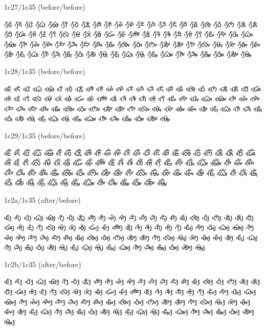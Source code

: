 \noindent
1c27/1c35 (before/before)

\noindent
ᰀᰧᰵᰶ ᰁᰧᰵᰶ ᰂᰧᰵᰶ ᰃᰧᰵᰶ ᰄᰧᰵᰶ ᰅᰧᰵᰶ ᰆᰧᰵᰶ ᰇᰧᰵᰶ ᰈᰧᰵᰶ ᰉᰧᰵᰶ ᰊᰧᰵᰶ ᰋᰧᰵᰶ ᰌᰧᰵᰶ ᰍᰧᰵᰶ ᰎᰧᰵᰶ ᰏᰧᰵᰶ ᰐᰧᰵᰶ ᰑᰧᰵᰶ ᰒᰧᰵᰶ ᰓᰧᰵᰶ ᰔᰧᰵᰶ ᰕᰧᰵᰶ ᰖᰧᰵᰶ ᰗᰧᰵᰶ ᰘᰧᰵᰶ ᰙᰧᰵᰶ ᰚᰧᰵᰶ ᰛᰧᰵᰶ ᰜᰧᰵᰶ ᰝᰧᰵᰶ ᰞᰧᰵᰶ ᰟᰧᰵᰶ ᰠᰧᰵᰶ ᰡᰧᰵᰶ ᰢᰧᰵᰶ ᰣᰧᰵᰶ ᱍᰧᰵᰶ ᱎᰧᰵᰶ ᱏᰧᰵᰶ ᰙ᰷ᰧᰵᰶ ᰛ᰷ᰧᰵᰶ ᰀᰤᰧᰵᰶ ᰁᰤᰧᰵᰶ ᰂᰤᰧᰵᰶ ᰃᰤᰧᰵᰶ ᰄᰤᰧᰵᰶ ᰅᰤᰧᰵᰶ ᰊᰤᰧᰵᰶ ᰋᰤᰧᰵᰶ ᰌᰤᰧᰵᰶ ᰎᰤᰧᰵᰶ ᰏᰤᰧᰵᰶ ᰐᰤᰧᰵᰶ ᰑᰤᰧᰵᰶ ᰒᰤᰧᰵᰶ ᰓᰤᰧᰵᰶ ᰔᰤᰧᰵᰶ ᰕᰤᰧᰵᰶ ᰖᰤᰧᰵᰶ ᰛᰤᰧᰵᰶ ᰜᰤᰧᰵᰶ ᰝᰤᰧᰵᰶ ᰞᰤᰧᰵᰶ ᰟᰤᰧᰵᰶ ᰡᰤᰧᰵᰶ ᰣᰤᰧᰵᰶ ᰀᰥᰧᰵᰶ ᰃᰥᰧᰵᰶ ᰅᰥᰧᰵᰶ ᰎᰥᰧᰵᰶ ᰑᰥᰧᰵᰶ ᰓᰥᰧᰵᰶ ᰕᰥᰧᰵᰶ ᰝᰥᰧᰵᰶ ᰀ᰷ᰥᰧᰵᰶ ᰃ᰷ᰥᰧᰵᰶ ᰝ᰷ᰥᰧᰵᰶ ᰀᰥᰤᰧᰵᰶ ᰃᰥᰤᰧᰵᰶ ᰅᰥᰤᰧᰵᰶ ᰎᰥᰤᰧᰵᰶ ᰑᰥᰤᰧᰵᰶ ᰓᰥᰤᰧᰵᰶ ᰕᰥᰤᰧᰵᰶ ᰝᰥᰤᰧᰵᰶ 

\noindent
1c28/1c35 (before/before)

\noindent
ᰀᰨᰵᰶ ᰁᰨᰵᰶ ᰂᰨᰵᰶ ᰃᰨᰵᰶ ᰄᰨᰵᰶ ᰅᰨᰵᰶ ᰆᰨᰵᰶ ᰇᰨᰵᰶ ᰈᰨᰵᰶ ᰉᰨᰵᰶ ᰊᰨᰵᰶ ᰋᰨᰵᰶ ᰌᰨᰵᰶ ᰍᰨᰵᰶ ᰎᰨᰵᰶ ᰏᰨᰵᰶ ᰐᰨᰵᰶ ᰑᰨᰵᰶ ᰒᰨᰵᰶ ᰓᰨᰵᰶ ᰔᰨᰵᰶ ᰕᰨᰵᰶ ᰖᰨᰵᰶ ᰗᰨᰵᰶ ᰘᰨᰵᰶ ᰙᰨᰵᰶ ᰚᰨᰵᰶ ᰛᰨᰵᰶ ᰜᰨᰵᰶ ᰝᰨᰵᰶ ᰞᰨᰵᰶ ᰟᰨᰵᰶ ᰠᰨᰵᰶ ᰡᰨᰵᰶ ᰢᰨᰵᰶ ᰣᰨᰵᰶ ᱍᰨᰵᰶ ᱎᰨᰵᰶ ᱏᰨᰵᰶ ᰙ᰷ᰨᰵᰶ ᰛ᰷ᰨᰵᰶ ᰀᰤᰨᰵᰶ ᰁᰤᰨᰵᰶ ᰂᰤᰨᰵᰶ ᰃᰤᰨᰵᰶ ᰄᰤᰨᰵᰶ ᰅᰤᰨᰵᰶ ᰊᰤᰨᰵᰶ ᰋᰤᰨᰵᰶ ᰌᰤᰨᰵᰶ ᰎᰤᰨᰵᰶ ᰏᰤᰨᰵᰶ ᰐᰤᰨᰵᰶ ᰑᰤᰨᰵᰶ ᰒᰤᰨᰵᰶ ᰓᰤᰨᰵᰶ ᰔᰤᰨᰵᰶ ᰕᰤᰨᰵᰶ ᰖᰤᰨᰵᰶ ᰛᰤᰨᰵᰶ ᰜᰤᰨᰵᰶ ᰝᰤᰨᰵᰶ ᰞᰤᰨᰵᰶ ᰟᰤᰨᰵᰶ ᰡᰤᰨᰵᰶ ᰣᰤᰨᰵᰶ ᰀᰥᰨᰵᰶ ᰃᰥᰨᰵᰶ ᰅᰥᰨᰵᰶ ᰎᰥᰨᰵᰶ ᰑᰥᰨᰵᰶ ᰓᰥᰨᰵᰶ ᰕᰥᰨᰵᰶ ᰝᰥᰨᰵᰶ ᰀ᰷ᰥᰨᰵᰶ ᰃ᰷ᰥᰨᰵᰶ ᰝ᰷ᰥᰨᰵᰶ ᰀᰥᰤᰨᰵᰶ ᰃᰥᰤᰨᰵᰶ ᰅᰥᰤᰨᰵᰶ ᰎᰥᰤᰨᰵᰶ ᰑᰥᰤᰨᰵᰶ ᰓᰥᰤᰨᰵᰶ ᰕᰥᰤᰨᰵᰶ ᰝᰥᰤᰨᰵᰶ 

\noindent
1c29/1c35 (before/before)

\noindent
ᰀᰩᰵᰶ ᰁᰩᰵᰶ ᰂᰩᰵᰶ ᰃᰩᰵᰶ ᰄᰩᰵᰶ ᰅᰩᰵᰶ ᰆᰩᰵᰶ ᰇᰩᰵᰶ ᰈᰩᰵᰶ ᰉᰩᰵᰶ ᰊᰩᰵᰶ ᰋᰩᰵᰶ ᰌᰩᰵᰶ ᰍᰩᰵᰶ ᰎᰩᰵᰶ ᰏᰩᰵᰶ ᰐᰩᰵᰶ ᰑᰩᰵᰶ ᰒᰩᰵᰶ ᰓᰩᰵᰶ ᰔᰩᰵᰶ ᰕᰩᰵᰶ ᰖᰩᰵᰶ ᰗᰩᰵᰶ ᰘᰩᰵᰶ ᰙᰩᰵᰶ ᰚᰩᰵᰶ ᰛᰩᰵᰶ ᰜᰩᰵᰶ ᰝᰩᰵᰶ ᰞᰩᰵᰶ ᰟᰩᰵᰶ ᰠᰩᰵᰶ ᰡᰩᰵᰶ ᰢᰩᰵᰶ ᰣᰩᰵᰶ ᱍᰩᰵᰶ ᱎᰩᰵᰶ ᱏᰩᰵᰶ ᰙ᰷ᰩᰵᰶ ᰛ᰷ᰩᰵᰶ ᰀᰤᰩᰵᰶ ᰁᰤᰩᰵᰶ ᰂᰤᰩᰵᰶ ᰃᰤᰩᰵᰶ ᰄᰤᰩᰵᰶ ᰅᰤᰩᰵᰶ ᰊᰤᰩᰵᰶ ᰋᰤᰩᰵᰶ ᰌᰤᰩᰵᰶ ᰎᰤᰩᰵᰶ ᰏᰤᰩᰵᰶ ᰐᰤᰩᰵᰶ ᰑᰤᰩᰵᰶ ᰒᰤᰩᰵᰶ ᰓᰤᰩᰵᰶ ᰔᰤᰩᰵᰶ ᰕᰤᰩᰵᰶ ᰖᰤᰩᰵᰶ ᰛᰤᰩᰵᰶ ᰜᰤᰩᰵᰶ ᰝᰤᰩᰵᰶ ᰞᰤᰩᰵᰶ ᰟᰤᰩᰵᰶ ᰡᰤᰩᰵᰶ ᰣᰤᰩᰵᰶ ᰀᰥᰩᰵᰶ ᰃᰥᰩᰵᰶ ᰅᰥᰩᰵᰶ ᰎᰥᰩᰵᰶ ᰑᰥᰩᰵᰶ ᰓᰥᰩᰵᰶ ᰕᰥᰩᰵᰶ ᰝᰥᰩᰵᰶ ᰀ᰷ᰥᰩᰵᰶ ᰃ᰷ᰥᰩᰵᰶ ᰝ᰷ᰥᰩᰵᰶ ᰀᰥᰤᰩᰵᰶ ᰃᰥᰤᰩᰵᰶ ᰅᰥᰤᰩᰵᰶ ᰎᰥᰤᰩᰵᰶ ᰑᰥᰤᰩᰵᰶ ᰓᰥᰤᰩᰵᰶ ᰕᰥᰤᰩᰵᰶ ᰝᰥᰤᰩᰵᰶ 

\noindent
1c2a/1c35 (after/before)

\noindent
ᰀᰪᰵᰶ ᰁᰪᰵᰶ ᰂᰪᰵᰶ ᰃᰪᰵᰶ ᰄᰪᰵᰶ ᰅᰪᰵᰶ ᰆᰪᰵᰶ ᰇᰪᰵᰶ ᰈᰪᰵᰶ ᰉᰪᰵᰶ ᰊᰪᰵᰶ ᰋᰪᰵᰶ ᰌᰪᰵᰶ ᰍᰪᰵᰶ ᰎᰪᰵᰶ ᰏᰪᰵᰶ ᰐᰪᰵᰶ ᰑᰪᰵᰶ ᰒᰪᰵᰶ ᰓᰪᰵᰶ ᰔᰪᰵᰶ ᰕᰪᰵᰶ ᰖᰪᰵᰶ ᰗᰪᰵᰶ ᰘᰪᰵᰶ ᰙᰪᰵᰶ ᰚᰪᰵᰶ ᰛᰪᰵᰶ ᰜᰪᰵᰶ ᰝᰪᰵᰶ ᰞᰪᰵᰶ ᰟᰪᰵᰶ ᰠᰪᰵᰶ ᰡᰪᰵᰶ ᰢᰪᰵᰶ ᰣᰪᰵᰶ ᱍᰪᰵᰶ ᱎᰪᰵᰶ ᱏᰪᰵᰶ ᰙ᰷ᰪᰵᰶ ᰛ᰷ᰪᰵᰶ ᰀᰤᰪᰵᰶ ᰁᰤᰪᰵᰶ ᰂᰤᰪᰵᰶ ᰃᰤᰪᰵᰶ ᰄᰤᰪᰵᰶ ᰅᰤᰪᰵᰶ ᰊᰤᰪᰵᰶ ᰋᰤᰪᰵᰶ ᰌᰤᰪᰵᰶ ᰎᰤᰪᰵᰶ ᰏᰤᰪᰵᰶ ᰐᰤᰪᰵᰶ ᰑᰤᰪᰵᰶ ᰒᰤᰪᰵᰶ ᰓᰤᰪᰵᰶ ᰔᰤᰪᰵᰶ ᰕᰤᰪᰵᰶ ᰖᰤᰪᰵᰶ ᰛᰤᰪᰵᰶ ᰜᰤᰪᰵᰶ ᰝᰤᰪᰵᰶ ᰞᰤᰪᰵᰶ ᰟᰤᰪᰵᰶ ᰡᰤᰪᰵᰶ ᰣᰤᰪᰵᰶ ᰀᰥᰪᰵᰶ ᰃᰥᰪᰵᰶ ᰅᰥᰪᰵᰶ ᰎᰥᰪᰵᰶ ᰑᰥᰪᰵᰶ ᰓᰥᰪᰵᰶ ᰕᰥᰪᰵᰶ ᰝᰥᰪᰵᰶ ᰀ᰷ᰥᰪᰵᰶ ᰃ᰷ᰥᰪᰵᰶ ᰝ᰷ᰥᰪᰵᰶ ᰀᰥᰤᰪᰵᰶ ᰃᰥᰤᰪᰵᰶ ᰅᰥᰤᰪᰵᰶ ᰎᰥᰤᰪᰵᰶ ᰑᰥᰤᰪᰵᰶ ᰓᰥᰤᰪᰵᰶ ᰕᰥᰤᰪᰵᰶ ᰝᰥᰤᰪᰵᰶ 

\noindent
1c2b/1c35 (after/before)

\noindent
ᰀᰫᰵᰶ ᰁᰫᰵᰶ ᰂᰫᰵᰶ ᰃᰫᰵᰶ ᰄᰫᰵᰶ ᰅᰫᰵᰶ ᰆᰫᰵᰶ ᰇᰫᰵᰶ ᰈᰫᰵᰶ ᰉᰫᰵᰶ ᰊᰫᰵᰶ ᰋᰫᰵᰶ ᰌᰫᰵᰶ ᰍᰫᰵᰶ ᰎᰫᰵᰶ ᰏᰫᰵᰶ ᰐᰫᰵᰶ ᰑᰫᰵᰶ ᰒᰫᰵᰶ ᰓᰫᰵᰶ ᰔᰫᰵᰶ ᰕᰫᰵᰶ ᰖᰫᰵᰶ ᰗᰫᰵᰶ ᰘᰫᰵᰶ ᰙᰫᰵᰶ ᰚᰫᰵᰶ ᰛᰫᰵᰶ ᰜᰫᰵᰶ ᰝᰫᰵᰶ ᰞᰫᰵᰶ ᰟᰫᰵᰶ ᰠᰫᰵᰶ ᰡᰫᰵᰶ ᰢᰫᰵᰶ ᰣᰫᰵᰶ ᱍᰫᰵᰶ ᱎᰫᰵᰶ ᱏᰫᰵᰶ ᰙ᰷ᰫᰵᰶ ᰛ᰷ᰫᰵᰶ ᰀᰤᰫᰵᰶ ᰁᰤᰫᰵᰶ ᰂᰤᰫᰵᰶ ᰃᰤᰫᰵᰶ ᰄᰤᰫᰵᰶ ᰅᰤᰫᰵᰶ ᰊᰤᰫᰵᰶ ᰋᰤᰫᰵᰶ ᰌᰤᰫᰵᰶ ᰎᰤᰫᰵᰶ ᰏᰤᰫᰵᰶ ᰐᰤᰫᰵᰶ ᰑᰤᰫᰵᰶ ᰒᰤᰫᰵᰶ ᰓᰤᰫᰵᰶ ᰔᰤᰫᰵᰶ ᰕᰤᰫᰵᰶ ᰖᰤᰫᰵᰶ ᰛᰤᰫᰵᰶ ᰜᰤᰫᰵᰶ ᰝᰤᰫᰵᰶ ᰞᰤᰫᰵᰶ ᰟᰤᰫᰵᰶ ᰡᰤᰫᰵᰶ ᰣᰤᰫᰵᰶ ᰀᰥᰫᰵᰶ ᰃᰥᰫᰵᰶ ᰅᰥᰫᰵᰶ ᰎᰥᰫᰵᰶ ᰑᰥᰫᰵᰶ ᰓᰥᰫᰵᰶ ᰕᰥᰫᰵᰶ ᰝᰥᰫᰵᰶ ᰀ᰷ᰥᰫᰵᰶ ᰃ᰷ᰥᰫᰵᰶ ᰝ᰷ᰥᰫᰵᰶ ᰀᰥᰤᰫᰵᰶ ᰃᰥᰤᰫᰵᰶ ᰅᰥᰤᰫᰵᰶ ᰎᰥᰤᰫᰵᰶ ᰑᰥᰤᰫᰵᰶ ᰓᰥᰤᰫᰵᰶ ᰕᰥᰤᰫᰵᰶ ᰝᰥᰤᰫᰵᰶ 

